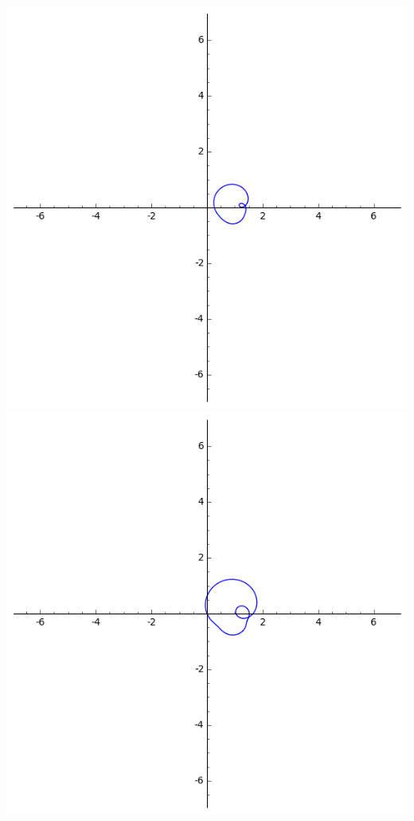 \documentclass[class=report,crop=false]{standalone}
\begin{document}
\begin{center}
  \includegraphics[scale=0.3]{figures/polynome1}\quad
\includegraphics[scale=0.3]{figures/polynome2}\quad

\end{center}
\end{document}
